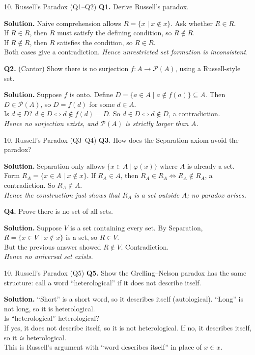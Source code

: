 \documentclass[aspectratio=169,10pt]{beamer}
\newcommand{\qa}[3]{%
  \textbf{Q#1.} #2\par\smallskip
  {\color{ans}\textbf{Solution.} #3}\par\vspace{6pt}}
\begin{document}
\begin{frame}{10. Russell's Paradox (Q1--Q2)}
\footnotesize
\qa{1}{Derive Russell's paradox.}
{Naive comprehension allows $R=\{x\mid x\notin x\}$. Ask whether $R\in R$.\\
If $R\in R$, then $R$ must satisfy the defining condition, so $R\notin R$.\\
If $R\notin R$, then $R$ satisfies the condition, so $R\in R$.\\
Both cases give a contradiction. \emph{Hence unrestricted set formation is inconsistent.}}
\qa{2}{(Cantor) Show there is no surjection $f:A\to\mathcal P(A)$, using a Russell-style set.}
{Suppose $f$ is onto. Define $D=\{a\in A\mid a\notin f(a)\}\subseteq A$. Then $D\in\mathcal P(A)$, so $D=f(d)$ for some $d\in A$.\\
Is $d\in D$? $d\in D\iff d\notin f(d)=D$. So $d\in D\iff d\notin D$, a contradiction.\\
\emph{Hence no surjection exists, and $\mathcal P(A)$ is strictly larger than $A$.}}
\end{frame}

\begin{frame}{10. Russell's Paradox (Q3--Q4)}
\footnotesize
\qa{3}{How does the Separation axiom avoid the paradox?}
{Separation only allows $\{x\in A\mid\varphi(x)\}$ where $A$ is already a set.\\
Form $R_A=\{x\in A\mid x\notin x\}$. If $R_A\in A$, then $R_A\in R_A\iff R_A\notin R_A$, a contradiction. So $R_A\notin A$.\\
\emph{Hence the construction just shows that $R_A$ is a set outside $A$; no paradox arises.}}
\qa{4}{Prove there is no set of all sets.}
{Suppose $V$ is a set containing every set. By Separation, $R=\{x\in V\mid x\notin x\}$ is a set, so $R\in V$.\\
But the previous answer showed $R\notin V$. Contradiction.\\
\emph{Hence no universal set exists.}}
\end{frame}

\begin{frame}{10. Russell's Paradox (Q5)}
\footnotesize
\qa{5}{Show the Grelling--Nelson paradox has the same structure: call a word ``heterological'' if it does not describe itself.}
{``Short'' is a short word, so it describes itself (autological). ``Long'' is not long, so it is heterological.\\
Is ``heterological'' heterological?\\
If yes, it does not describe itself, so it is not heterological. If no, it describes itself, so it \emph{is} heterological.\\
This is Russell's argument with ``word describes itself'' in place of $x\in x$.}
\end{frame}
\end{document}
